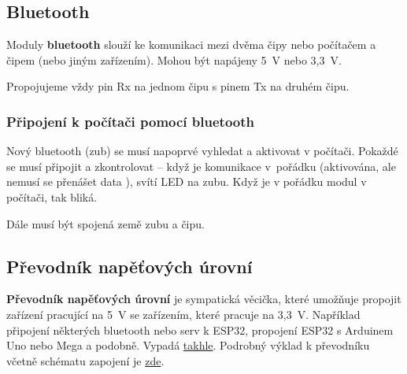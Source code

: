 \subsection{Bluetooth} 

\hypertarget{bluetooth}{} Moduly {\bf bluetooth} slouží ke komunikaci mezi dvěma čipy nebo počítačem a čipem (nebo jiným zařízením).
Mohou být napájeny 5~V nebo 3,3~V. 
\label{bluetooth} 

Propojujeme vždy pin Rx na jednom čipu s pinem Tx na druhém čipu. 

\subsubsection*{Připojení k počítači pomocí bluetooth}

Nový bluetooth (zub) se musí napoprvé vyhledat a aktivovat v počítači. 
Pokaždé se musí připojit a zkontrolovat -- když je komunikace v~pořádku (aktivována, ale nemusí se přenášet data ), svítí LED na zubu. 
Když je v pořádku modul v počítači, tak bliká.  

Dále musí být spojená země zubu a čipu.


\subsection{Převodník napěťových úrovní} \label{prevodnik}

\textbf{Převodník napěťových úrovní}   je sympatická věcička,
které umožňuje propojit zařízení pracující na 5~V se zařízením, které pracuje na 3,3~V. Například připojení některých bluetooth nebo serv k ESP32, propojení ESP32  s Arduinem Uno nebo Mega a podobně. 
Vypadá \href{https://www.gme.cz/obousmerny-prevodnik-urovni-5v-3-3v}{takhle}. 
Podrobný výklad k převodníku včetně schématu zapojení je \href{https://www.arduinotech.cz/inpage/arduino-v-prikladech-v-dil-menu-na-lcd/}{zde}.
